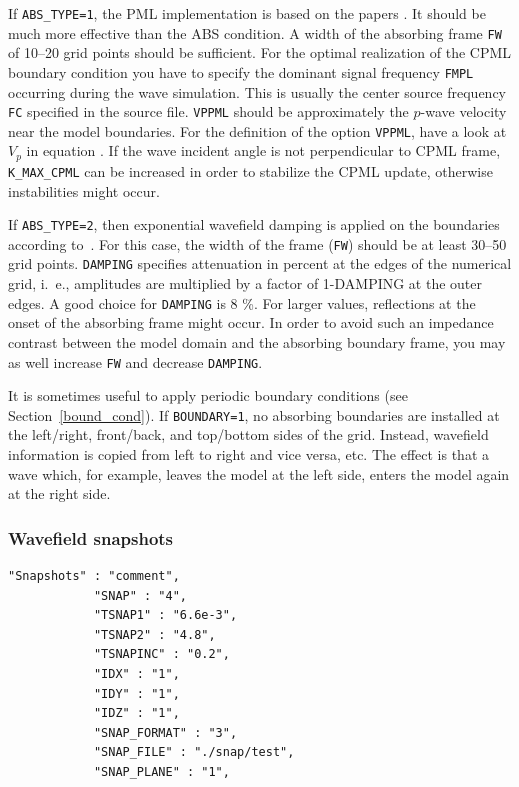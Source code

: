 \documentclass[11pt,onecolumn,oneside]{article}
\newcommand{\option}[1]{\texttt{#1}}
\begin{document}
If \option{ABS\_TYPE=1}, the PML implementation is based on the papers
\cite{collino:01,komatitsch:07,martin:09}. It should be
much more effective than the ABS condition. A width of the absorbing frame
\option{FW} of 10--20 grid points should be sufficient. For the optimal
realization of the CPML boundary condition you have to specify the dominant
signal frequency \option{FMPL} occurring during the wave simulation. This is
usually the center source frequency \option{FC} specified in the source file.
\option{VPPML} should be approximately the $p$-wave velocity near the model
boundaries. For the definition of the option \option{VPPML}, have a look at
$V_p$ in equation . If the wave incident angle is not perpendicular
to CPML frame, \option{K\_MAX\_CPML} can be increased in order to stabilize the
CPML update, otherwise instabilities might occur.

If \option{ABS\_TYPE=2}, then exponential wavefield damping is applied on the
boundaries according to~\cite{cerjan:85}. For this case, the width of the frame
(\option{FW}) should be at least 30--50 grid points. \option{DAMPING} specifies
attenuation in percent at the edges of the numerical grid, i.\ e., amplitudes
are multiplied by a factor of 1-DAMPING at the outer edges. A good choice for
\option{DAMPING} is 8 \%. For larger values, reflections at the onset of the
absorbing frame might occur. In order to avoid such an impedance contrast
between the model domain and the absorbing boundary frame, you may as well
increase \option{FW} and decrease \option{DAMPING}.

It is sometimes useful to apply periodic boundary conditions (see
Section~\ref{bound_cond}). If \texttt{BOUNDARY=1}, no absorbing boundaries are
installed at the left/right, front/back, and top/bottom sides of the grid.
Instead, wavefield information is copied from left to right and vice versa,
etc. The effect is that a wave which, for example, leaves the model at the left
side, enters the model again at the right side.

\subsubsection{Wavefield snapshots}
\begin{verbatim}
"Snapshots" : "comment",
            "SNAP" : "4",
            "TSNAP1" : "6.6e-3",
            "TSNAP2" : "4.8",
            "TSNAPINC" : "0.2",
            "IDX" : "1",
            "IDY" : "1",
            "IDZ" : "1",
            "SNAP_FORMAT" : "3",
            "SNAP_FILE" : "./snap/test",
            "SNAP_PLANE" : "1",
\end{verbatim}
\end{document}
